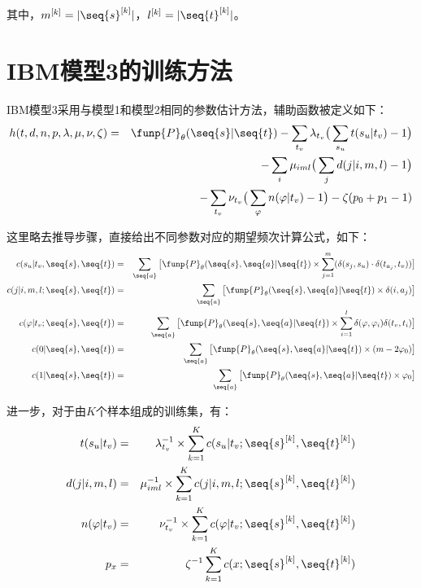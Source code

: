 \begin{appendices}
\noindent 其中，$m^{[k]}=|\seq{s}^{[k]}|$，$l^{[k]}=|\seq{t}^{[k]}|$。


\section{IBM模型3的训练方法}
\parinterval IBM模型3采用与模型1和模型2相同的参数估计方法，辅助函数被定义如下：
\begin{eqnarray}
h(t,d,n,p, \lambda,\mu, \nu, \zeta) & = &  \funp{P}_{\theta}(\seq{s}|\seq{t})-\sum_{t_v}\lambda_{t_v}\big(\sum_{s_u}t(s_u|t_v)-1\big)  \nonumber \\
& & -\sum_{i}\mu_{iml}\big(\sum_{j}d(j|i,m,l)-1\big) \nonumber \\
& & -\sum_{t_v}\nu_{t_v}\big(\sum_{\varphi}n(\varphi|t_v)-1\big)-\zeta(p_0+p_1-1)
\label{eq:1.1}
\end{eqnarray}

\parinterval 这里略去推导步骤，直接给出不同参数对应的期望频次计算公式，如下：
\begin{eqnarray}
c(s_u|t_v,\seq{s},\seq{t}) & = & \sum_{\seq{a}}\big[\funp{P}_{\theta}(\seq{s},\seq{a}|\seq{t}) \times \sum_{j=1}^{m} (\delta(s_j,s_u) \cdot \delta(t_{a_{j}},t_v))\big] \label{eq:1.2} \\
c(j|i,m,l;\seq{s},\seq{t}) & = & \sum_{\seq{a}}\big[\funp{P}_{\theta}(\seq{s},\seq{a}|\seq{t}) \times \delta(i,a_j)\big] \label{eq:1.3} \\
c(\varphi|t_v;\seq{s},\seq{t}) & = & \sum_{\seq{a}}\big[\funp{P}_{\theta}(\seq{s},\seq{a}|\seq{t}) \times \sum_{i=1}^{l}\delta(\varphi,\varphi_{i})\delta(t_v,t_i)\big] \label{eq:1.4} \\
c(0|\seq{s},\seq{t}) & = & \sum_{\seq{a}}\big[\funp{P}_{\theta}(\seq{s},\seq{a}|\seq{t})  \times (m-2\varphi_0) \big] \label{eq:1.5} \\
c(1|\seq{s},\seq{t}) & = & \sum_{\seq{a}}\big[\funp{P}_{\theta}(\seq{s},\seq{a}|\seq{t}) \times \varphi_0 \big] \label{eq:1.6}
\end{eqnarray}

\parinterval 进一步，对于由$K$个样本组成的训练集，有：
\begin{eqnarray}
t(s_u|t_v) & = & \lambda_{t_v}^{-1} \times \sum_{k=1}^{K}c(s_u|t_v;\seq{s}^{[k]},\seq{t}^{[k]}) \label{eq:1.7} \\
d(j|i,m,l) & = & \mu_{iml}^{-1} \times \sum_{k=1}^{K}c(j|i,m,l;\seq{s}^{[k]},\seq{t}^{[k]}) \label{eq:1.8} \\
n(\varphi|t_v) & = & \nu_{t_v}^{-1} \times \sum_{k=1}^{K}c(\varphi |t_v;\seq{s}^{[k]},\seq{t}^{[k]}) \label{eq:1.9} \\
p_x & = & \zeta^{-1} \sum_{k=1}^{K}c(x;\seq{s}^{[k]},\seq{t}^{[k]}) \label{eq:1.10}
\end{eqnarray}


\end{appendices}
